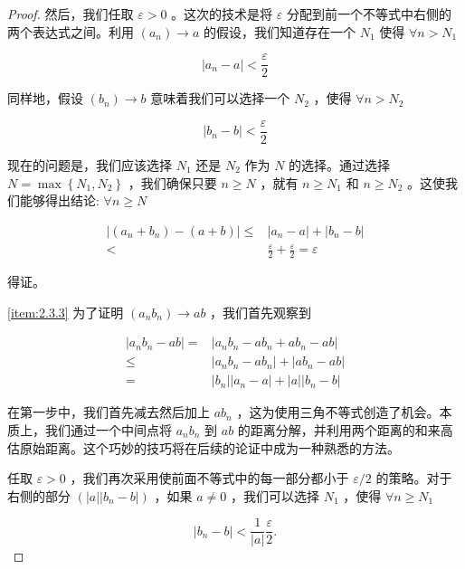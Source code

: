 \begin{proof}
然后，我们任取 \(\varepsilon  > 0\) 。这次的技术是将 \(\varepsilon\) 分配到前一个不等式中右侧的两个表达式之间。利用 \(\left( {a}_{n}\right)  \rightarrow  a\) 的假设，我们知道存在一个 \({N}_{1}\) 使得 $\forall n> N_1$

\[
\left| {{a}_{n} - a}\right|  < \frac{\varepsilon }{2}
\]

同样地，假设 \(\left( {b}_{n}\right)  \rightarrow  b\) 意味着我们可以选择一个 \({N}_{2}\) ，使得 $\forall n>N_2$

\[
\left| {{b}_{n} - b}\right|  < \frac{\varepsilon }{2}
\]

现在的问题是，我们应该选择 \({N}_{1}\) 还是 \({N}_{2}\) 作为 \(N\) 的选择。通过选择 \(N = \max \left\{  {{N}_{1},{N}_{2}}\right\}\) ，我们确保只要 \(n \geq  N\) ，就有 \(n \geq  {N}_{1}\) 和 \(n \geq  {N}_{2}\) 。这使我们能够得出结论: $\forall n\ge N$

\begin{align*}
  \left| {\left( {{a}_{n} + {b}_{n}}\right)  - \left( {a + b}\right) }\right|  \leq  &\left| {{a}_{n} - a}\right|  + \left| {{b}_{n} - b}\right|\\
  <& \frac{\varepsilon }{2} + \frac{\varepsilon }{2} = \varepsilon
\end{align*}

得证。

\ref{item:2.3.3} 为了证明 \(\left( {{a}_{n}{b}_{n}}\right)  \rightarrow  {ab}\) ，我们首先观察到

\begin{align*}
\left| {{a}_{n}{b}_{n} - {ab}}\right|  = & \left| {{a}_{n}{b}_{n} - a{b}_{n} + a{b}_{n} - {ab}}\right|\\
\leq &  \left| {{a}_{n}{b}_{n} - a{b}_{n}}\right|  + \left| {a{b}_{n} - {ab}}\right|\\
= & \left| {b}_{n}\right| \left| {{a}_{n} - a}\right|  + \left| a\right| \left| {{b}_{n} - b}\right| 
\end{align*}


在第一步中，我们首先减去然后加上 \(a{b}_{n}\) ，这为使用三角不等式创造了机会。本质上，我们通过一个中间点将 \({a}_{n}{b}_{n}\) 到 \({ab}\) 的距离分解，并利用两个距离的和来高估原始距离。这个巧妙的技巧将在后续的论证中成为一种熟悉的方法。

任取 \(\varepsilon  > 0\) ，我们再次采用使前面不等式中的每一部分都小于 \(\varepsilon /2\) 的策略。对于右侧的部分 \(\left( {\left| a\right| \left| {{b}_{n} - b}\right| }\right)\) ，如果 \(a \neq  0\) ，我们可以选择 \({N}_{1}\) ，使得 $\forall n\ge N_1$

\[
\left| {{b}_{n} - b}\right|  < \frac{1}{\left| a\right| }\frac{\varepsilon }{2}.
\]


\end{proof}
